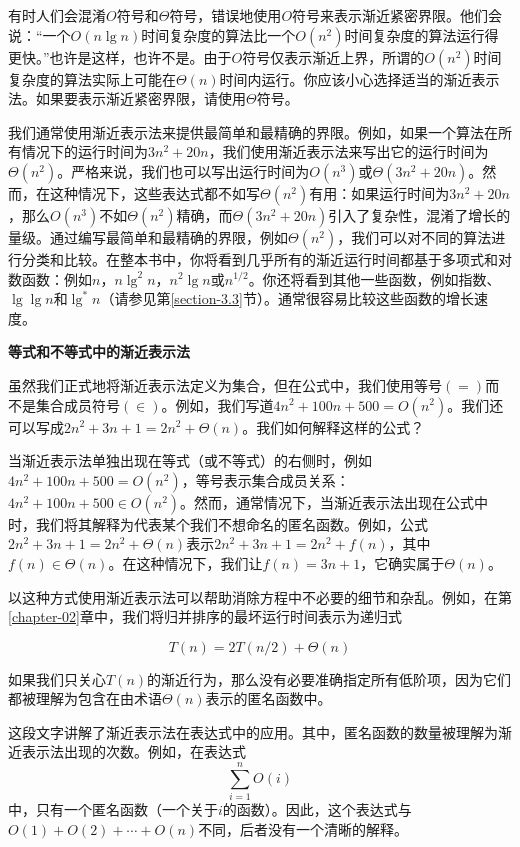 \documentclass[lang=cn,newtx,10pt,scheme=chinese]{elegantbook}
\begin{document}
有时人们会混淆$O$符号和$\Theta$符号，错误地使用$O$符号来表示渐近紧密界限。他们会说：“一个$O(n\lg n)$时间复杂度的算法比一个$O\left(n^2\right)$时间复杂度的算法运行得更快。”也许是这样，也许不是。由于$O$符号仅表示渐近上界，所谓的$O\left(n^2\right)$时间复杂度的算法实际上可能在$\Theta(n)$时间内运行。你应该小心选择适当的渐近表示法。如果要表示渐近紧密界限，请使用$\Theta$符号。

我们通常使用渐近表示法来提供最简单和最精确的界限。例如，如果一个算法在所有情况下的运行时间为$3n^2+20n$，我们使用渐近表示法来写出它的运行时间为$\Theta\left(n^2\right)$。严格来说，我们也可以写出运行时间为$O\left(n^3\right)$或$\Theta\left(3n^2+20n\right)$。然而，在这种情况下，这些表达式都不如写$\Theta\left(n^2\right)$有用：如果运行时间为$3n^2+20n$，那么$O\left(n^3\right)$不如$\Theta\left(n^2\right)$精确，而$\Theta\left(3n^2+20n\right)$引入了复杂性，混淆了增长的量级。通过编写最简单和最精确的界限，例如$\Theta\left(n^2\right)$，我们可以对不同的算法进行分类和比较。在整本书中，你将看到几乎所有的渐近运行时间都基于多项式和对数函数：例如$n，n \lg ^2 n，n^2 \lg n$或$n^{1 / 2}$。你还将看到其他一些函数，例如指数、$\lg \lg n$和$\lg ^* n$（请参见第\ref{section-3.3}节）。通常很容易比较这些函数的增长速度。

\textbf{等式和不等式中的渐近表示法}

虽然我们正式地将渐近表示法定义为集合，但在公式中，我们使用等号$(=)$而不是集合成员符号$(\in)$。例如，我们写道$4n^2+100n+500=O\left(n^2\right)$。我们还可以写成$2n^2+3n+1=2n^2+\Theta(n)$。我们如何解释这样的公式？

当渐近表示法单独出现在等式（或不等式）的右侧时，例如$4n^2+100n+500=O\left(n^2\right)$，等号表示集合成员关系：$4n^2+100n+500 \in O\left(n^2\right)$。然而，通常情况下，当渐近表示法出现在公式中时，我们将其解释为代表某个我们不想命名的匿名函数。例如，公式$2n^2+3n+1=2n^2+\Theta(n)$表示$2n^2+3n+1=2n^2+f(n)$，其中$f(n) \in \Theta(n)$。在这种情况下，我们让$f(n)=3n+1$，它确实属于$\Theta(n)$。

以这种方式使用渐近表示法可以帮助消除方程中不必要的细节和杂乱。例如，在第\ref{chapter-02}章中，我们将归并排序的最坏运行时间表示为递归式

$$
T(n)=2 T(n / 2)+\Theta(n)
$$

如果我们只关心$T(n)$的渐近行为，那么没有必要准确指定所有低阶项，因为它们都被理解为包含在由术语$\Theta(n)$表示的匿名函数中。

这段文字讲解了渐近表示法在表达式中的应用。其中，匿名函数的数量被理解为渐近表示法出现的次数。例如，在表达式$$\sum_{i=1}^n O(i)$$中，只有一个匿名函数（一个关于$i$的函数）。因此，这个表达式与$O(1)+O(2)+\cdots+O(n)$不同，后者没有一个清晰的解释。
\end{document}
